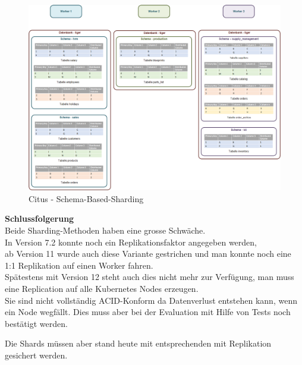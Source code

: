 \begin{flushleft}
\begin{flushleft}
\begin{flushleft}
            \begin{figure}[H]
                \centering
                \includegraphics[width=0.8\linewidth]{source/implementation/evaluation/postgresql_ha_solutions/stackgres/citus_schema-based-sharding}
                \caption{Citus - Schema-Based-Sharding}
                \label{fig:citus_schema-based-sharding}
            \end{figure}
        \end{flushleft}
        \begin{flushleft}
            \textbf{Schlussfolgerung}\\
            Beide Sharding-Methoden haben eine grosse Schwäche.\\
            In Version 7.2 konnte noch ein Replikationsfaktor angegeben werden\cite{8W58EW47},\\
            ab Version 11 wurde auch diese Variante gestrichen und man konnte noch eine 1:1 Replikation auf einen Worker fahren\cite{JWYDYYWQ}.\\
            Spätestens mit Version 12 steht auch dies nicht mehr zur Verfügung, man muss eine Replication auf alle \Gls{Kubernetes} Nodes erzeugen.\\
            Sie sind nicht vollständig ACID-Konform da Datenverlust entstehen kann, wenn ein Node wegfällt.
            Dies muss aber bei der Evaluation mit Hilfe von Tests noch bestätigt werden.
        \end{flushleft}
        \begin{flushleft}
            Die Shards müssen aber stand heute mit entsprechenden mit Replikation gesichert werden\cite{4GDXA49I}.\\

\end{flushleft}
\end{flushleft}
\end{flushleft}
